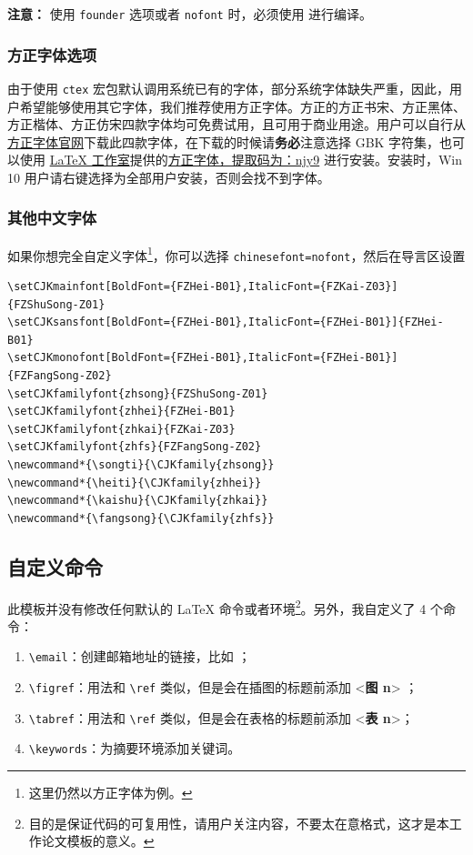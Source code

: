 \documentclass[lang=cn,11pt,a4paper,cite=authoryear]{elegantpaper}
\begin{document}
\noindent \textbf{注意：} 使用 \lstinline{founder} 选项或者 \lstinline{nofont} 时，必须使用  进行编译。

\subsubsection{方正字体选项}
由于使用 \lstinline{ctex} 宏包默认调用系统已有的字体，部分系统字体缺失严重，因此，用户希望能够使用其它字体，我们推荐使用方正字体。方正的{\songti 方正书宋}、{\heiti 方正黑体}、{\kaishu 方正楷体}、{\fangsong 方正仿宋}四款字体均可免费试用，且可用于商业用途。用户可以自行从\href{http://www.foundertype.com/}{方正字体官网}下载此四款字体，在下载的时候请\textbf{务必}注意选择 GBK 字符集，也可以使用 \href{https://www.latexstudio.net/}{\LaTeX{} 工作室}提供的\href{https://pan.baidu.com/s/1BgbQM7LoinY7m8yeP25Y7Q}{方正字体，提取码为：njy9} 进行安装。安装时，{\kaishu Win 10 用户请右键选择为全部用户安装，否则会找不到字体。}

\begin{figure}[!htb]
\centering

\end{figure}

\subsubsection{其他中文字体}
如果你想完全自定义字体\footnote{这里仍然以方正字体为例。}，你可以选择 \lstinline{chinesefont=nofont}，然后在导言区设置
\begin{lstlisting}
\setCJKmainfont[BoldFont={FZHei-B01},ItalicFont={FZKai-Z03}]{FZShuSong-Z01}
\setCJKsansfont[BoldFont={FZHei-B01},ItalicFont={FZHei-B01}]{FZHei-B01}
\setCJKmonofont[BoldFont={FZHei-B01},ItalicFont={FZHei-B01}]{FZFangSong-Z02}
\setCJKfamilyfont{zhsong}{FZShuSong-Z01}
\setCJKfamilyfont{zhhei}{FZHei-B01}
\setCJKfamilyfont{zhkai}{FZKai-Z03}
\setCJKfamilyfont{zhfs}{FZFangSong-Z02}
\newcommand*{\songti}{\CJKfamily{zhsong}}
\newcommand*{\heiti}{\CJKfamily{zhhei}}
\newcommand*{\kaishu}{\CJKfamily{zhkai}}
\newcommand*{\fangsong}{\CJKfamily{zhfs}}
\end{lstlisting}


\subsection{自定义命令}
此模板并没有修改任何默认的 \LaTeX{} 命令或者环境\footnote{目的是保证代码的可复用性，请用户关注内容，不要太在意格式，这才是本工作论文模板的意义。}。另外，我自定义了 4 个命令：
\begin{enumerate}
  \item \lstinline{\email}：创建邮箱地址的链接，比如 ；
  \item \lstinline{\figref}：用法和 \lstinline{\ref} 类似，但是会在插图的标题前添加 <\textbf{图 n}> ；
  \item \lstinline{\tabref}：用法和 \lstinline{\ref} 类似，但是会在表格的标题前添加 <\textbf{表 n}>；
  \item \lstinline{\keywords}：为摘要环境添加关键词。
\end{enumerate}
\end{document}
